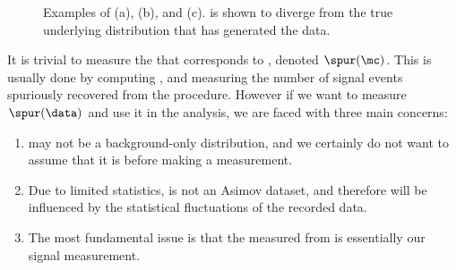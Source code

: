 \begin{figure}[!htpb]
\centering
{}
\caption{Examples of \mc (a), \data (b), and \truthdata (c). \mc is shown to diverge from the true underlying distribution that has generated the data.}
\label{fig:datasets}
\end{figure}


It is trivial to measure the \spur that corresponds to \mc, denoted $\spur(\mc)$. This is usually done by computing \nbkgmc, and measuring the number of signal events spuriously recovered from the procedure.
However if we want to measure $\spur(\data)$ and use it in the analysis, we are faced with three main concerns:
\begin{enumerate}
    \item \data may not be a background-only distribution, and we certainly do not want to assume that it is before making a measurement.
    \item Due to limited statistics, \data is not an Asimov dataset, and therefore \nbkgdata will be influenced by the statistical fluctuations of the recorded data.
    \item The most fundamental issue is that the \spur measured from \nbkgdata is essentially our signal measurement.
\end{enumerate}

